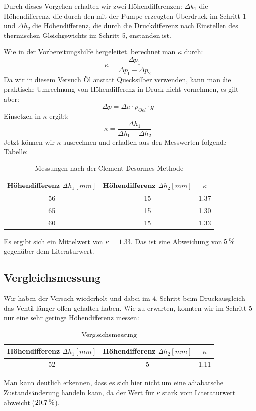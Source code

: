 \documentclass[a4paper,titlepage]{scrartcl}
\numberwithin{equation}{section}
\begin{document}
Durch dieses Vorgehen erhalten wir zwei Höhendifferenzen: $\Delta h_1$ die Höhendifferenz, die durch den mit der Pumpe erzeugten Überdruck im Schritt 1 und $\Delta h_2$ die Höhendifferenz, die durch die Druckdifferenz nach Einstellen des thermischen Gleichgewichts im Schritt 5, enstanden ist.

Wie in der Vorbereitungshilfe hergeleitet, berechnet man $\kappa$ durch:
\begin{equation*}
\kappa = \frac{\Delta p_1}{\Delta p_1 - \Delta p_2}
\end{equation*}
Da wir in diesem Versuch Öl anstatt Quecksilber verwenden, kann man die praktische Umrechnung von Höhendifferenz in Druck nicht vornehmen, es gilt aber:
\begin{equation*}
\Delta p=\Delta h \cdot \rho_{Oel} \cdot g
\end{equation*}
Einsetzen in $\kappa$ ergibt:
\begin{equation*}
\kappa=\frac{\Delta h_1}{\Delta h_1 - \Delta h_2}
\end{equation*}
Jetzt können wir $\kappa$ ausrechnen und erhalten aus den Messwerten folgende Tabelle:
\begin{table}[H]
\begin{tabular}{c|c|c}
	Höhendifferenz $\Delta h_1 [mm]$ & Höhendifferenz $\Delta h_2 [mm]$ & $\kappa$ \\
	\hline
	56 & 15 & 1.37 \\
	65 & 15 & 1.30 \\
	60 & 15 & 1.33 \\
\end{tabular}
\caption{Messungen nach der Clement-Desormes-Methode}
\label{tab:aufgabe21}
\end{table}

Es ergibt sich ein Mittelwert von $\kappa=1.33$. Das ist eine Abweichung von $\unit[5]{\%}$ gegenüber dem Literaturwert.

\subsection{Vergleichsmessung}
Wir haben der Versuch wiederholt und dabei im 4. Schritt beim Druckausgleich das Ventil länger offen gehalten haben. Wie zu erwarten, konnten wir im Schritt 5 nur eine sehr geringe Höhendifferenz messen:
\begin{table}[H]
\begin{tabular}{c|c|c}
	Höhendifferenz $\Delta h_1 [mm]$ & Höhendifferenz $\Delta h_2 [mm]$ & $\kappa$ \\
	\hline
	52 & 5 & 1.11 \\
\end{tabular}
\caption{Vergleichsmessung}
\label{tab:aufgabe22}
\end{table}
Man kann deutlich erkennen, dass es sich hier nicht um eine adiabatsche Zustandsänderung handeln kann, da der Wert für $\kappa$ stark vom Literaturwert abweicht ($\unit[20.7]{\%}$).
\end{document}
